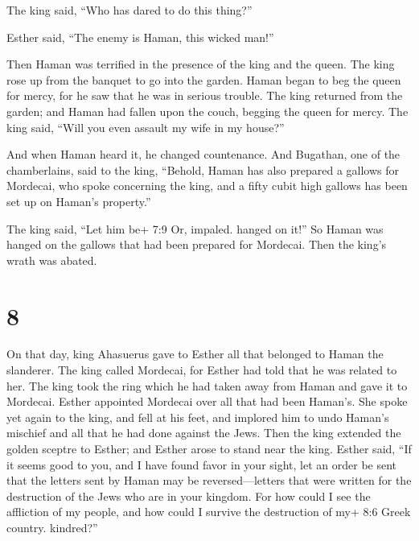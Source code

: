  The king said, ``Who has dared to do this thing?''

 Esther said, ``The enemy is Haman, this wicked man!''

Then Haman was terrified in the presence of the king and the queen.
 The king rose up from the banquet to go into the garden.
Haman began to beg the queen for mercy, for he saw that he was in
serious trouble.  The king returned from the garden; and
Haman had fallen upon the couch, begging the queen for mercy. The king
said, ``Will you even assault my wife in my house?''

And when Haman heard it, he changed countenance.  And
Bugathan, one of the chamberlains, said to the king, ``Behold, Haman has
also prepared a gallows for Mordecai, who spoke concerning the king, and
a fifty cubit high gallows has been set up on Haman's property.''

The king said, ``Let him be+ 7:9 Or, impaled. hanged on it!''
 So Haman was hanged on the gallows that had been prepared
for Mordecai. Then the king's wrath was abated.

\hypertarget{section-7}{%
\section{8}\label{section-7}}

 On that day, king Ahasuerus gave to Esther all that
belonged to Haman the slanderer. The king called Mordecai, for Esther
had told that he was related to her.  The king took the ring
which he had taken away from Haman and gave it to Mordecai. Esther
appointed Mordecai over all that had been Haman's.  She
spoke yet again to the king, and fell at his feet, and implored him to
undo Haman's mischief and all that he had done against the Jews.
 Then the king extended the golden sceptre to Esther; and
Esther arose to stand near the king.  Esther said, ``If it
seems good to you, and I have found favor in your sight, let an order be
sent that the letters sent by Haman may be reversed---letters that were
written for the destruction of the Jews who are in your kingdom.
 For how could I see the affliction of my people, and how
could I survive the destruction of my+ 8:6 Greek country. kindred?''

